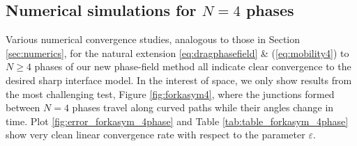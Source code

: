 \documentclass{article}
\theoremstyle{plain}
\theoremstyle{definition}
\theoremstyle{remark}
\newcommand{\eps}{\varepsilon}
\begin{document}
\subsection{Numerical simulations for $N=4$ phases}

Various numerical convergence studies, analogous to those in Section \ref{sec:numerics}, for the natural extension \eqref{eq:dragphasefield} \& (\ref{eq:mobility4}) to $N\geq 4$ phases of our new phase-field method all indicate clear convergence to the desired sharp interface model.
In the interest of space, we only show results from the most challenging test, Figure \ref{fig:forkasym4}, where the junctions formed between $N=4$ phases travel along curved paths while their angles change in time.
Plot \ref{fig:error_forkasym_4phase} and Table \ref{tab:table_forkasym_4phase} show very clean linear convergence rate with respect to the parameter $\varepsilon$.















\end{document}
